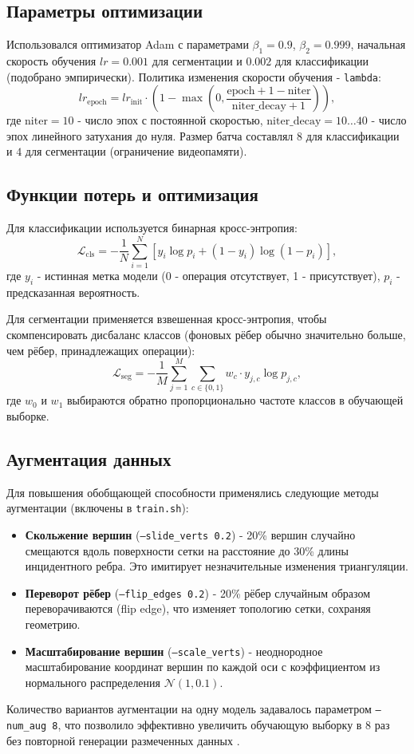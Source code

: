 \subsection{Параметры оптимизации}
Использовался оптимизатор Adam с параметрами $\beta_1 = 0.9$, $\beta_2 = 0.999$, начальная скорость обучения $lr = 0.001$ для сегментации и $0.002$ для классификации (подобрано эмпирически). Политика изменения скорости обучения - \texttt{lambda}: 
\[
lr_{\text{epoch}} = lr_{\text{init}} \cdot \left(1 - \max\left(0, \frac{\text{epoch} + 1 - \text{niter}}{\text{niter\_decay} + 1}\right)\right),
\]
где $\text{niter}=10$ - число эпох с постоянной скоростью, $\text{niter\_decay}=10\ldots40$ - число эпох линейного затухания до нуля. Размер батча составлял $8$ для классификации и $4$ для сегментации (ограничение видеопамяти).

\subsection{Функции потерь и оптимизация}
Для классификации используется бинарная кросс-энтропия:
\[
\mathcal{L}_{\text{cls}} = -\frac{1}{N}\sum_{i=1}^{N}\left[y_i\log p_i + (1-y_i)\log(1-p_i)\right],
\]
где $y_i$ - истинная метка модели (0 - операция отсутствует, 1 - присутствует), $p_i$ - предсказанная вероятность.

Для сегментации применяется взвешенная кросс-энтропия, чтобы скомпенсировать дисбаланс классов (фоновых рёбер обычно значительно больше, чем рёбер, принадлежащих операции):
\[
\mathcal{L}_{\text{seg}} = -\frac{1}{M}\sum_{j=1}^{M}\sum_{c\in\{0,1\}} w_c \cdot y_{j,c} \log p_{j,c},
\]
где $w_0$ и $w_1$ выбираются обратно пропорционально частоте классов в обучающей выборке.

\subsection{Аугментация данных}
Для повышения обобщающей способности применялись следующие методы аугментации (включены в \texttt{train.sh}):
\begin{itemize}
    \item \textbf{Скольжение вершин} (\texttt{--slide\_verts 0.2}) - 20\% вершин случайно смещаются вдоль поверхности сетки на расстояние до 30\% длины инцидентного ребра. Это имитирует незначительные изменения триангуляции.
    \item \textbf{Переворот рёбер} (\texttt{--flip\_edges 0.2}) - 20\% рёбер случайным образом переворачиваются (flip edge), что изменяет топологию сетки, сохраняя геометрию.
    \item \textbf{Масштабирование вершин} (\texttt{--scale\_verts}) - неоднородное масштабирование координат вершин по каждой оси с коэффициентом из нормального распределения $\mathcal{N}(1, 0.1)$.
\end{itemize}
Количество вариантов аугментации на одну модель задавалось параметром \texttt{--num\_aug 8}, что позволило эффективно увеличить обучающую выборку в 8 раз без повторной генерации размеченных данных \cite{meshcnn2019}.

